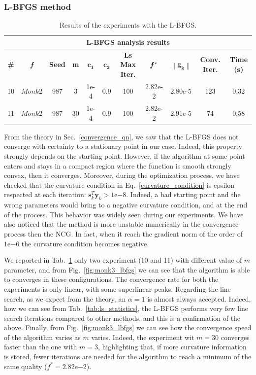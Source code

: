 \documentclass[11pt]{article}
\newcommand{\norm}[1]{\left\lVert#1\right\rVert}
\begin{document}
\subsubsection{L-BFGS method}
\begin{table}[H]
\small
    \centering
    \begin{tabular}{ |c|c|c|c|c|c|c|c|c|c|c|}
    \hline
     \multicolumn{11}{|c|}{\textbf{L-BFGS analysis results}} \\
      \hline
       \textbf{\#} & \textbf{\textit{f}} & \textbf{Seed} & \textbf{m} & $\mathbf{c_1}$ & $\mathbf{c_2}$ & \textbf{Ls Max Iter.} & $\mathbf{\textit{\textbf{f}}\,^*}$ & $\mathbf{\norm{\mathbf{g}_k}}$ & \textbf{Conv. Iter.} & \textbf{Time (s)}\\
     \hline
      10 & $Monk2$ & 987 & 3 & 1e-4 & 0.9 & 100 & 2.82e-2 & 2.80e-5 & 123 & 0.32\\
      \hline
      11 & $Monk2$ & 987 & 30 & 1e-4 & 0.9 & 100 & 2.82e-2 & 2.91e-5 &  74 & 0.58\\
      \hline
    \end{tabular}
    \caption{Results of the experiments with the L-BFGS.}
    \label{tab:lbfgs_behavior}
\end{table}


From the theory in Sec.~\ref{convergence_qn}, we saw that the L-BFGS does not converge with certainty to a stationary point in our case. Indeed, this property strongly depends on the starting point. However, if the algorithm at some point enters and stays in a compact region where the function is smooth strongly convex, then it converges. Moreover, during the optimization process, we have checked that the curvature condition in Eq.~\ref{curvature_condition} is epsilon respected at each iteration: $\mathbf{s}_k^T\mathbf{y}_k > 1\mathrm{e}{-8}$. Indeed, a bad starting point and the wrong parameters would bring to a negative curvature condition, and at the end of the process. This behavior was widely seen during our experiments.
We have also noticed that the method is more unstable numerically in the convergence process then the NCG. In fact, when it reach the gradient norm of the order of $1\mathrm{e}{-6}$ the curvature condition becomes negative.

We reported in Tab.~\ref{tab:lbfgs_behavior} only two experiment (10 and 11) with different value of $m$ parameter, and from Fig.~\ref{fig:monk3_lbfgs} we can see that the algorithm is able to converges in these configurations. The convergence rate for both the experiments is only linear, with some superlinear peaks. Regarding the line search, as we expect from the theory, an $\alpha=1$ is almost always accepted. Indeed, how we can see from Tab.~\ref{tab:ls_statistics}, the L-BFGS performs very few line search iterations compared to other methods, and this is a confirmation of the above. Finally, from Fig.~\ref{fig:monk3_lbfgs} we can see how the convergence speed of the algorithm varies as $m$ varies. Indeed, the experiment wit $m=30$ converges faster than the one with $m=3$, highlighting that, if more curvature information is stored, fewer iterations are needed for the algorithm to reach a minimum of the same quality ($f^* = 2.82\mathrm{e}{-2}$).
\end{document}
